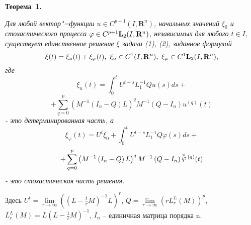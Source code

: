 \textbf{Теорема~1.} {\it
Для любой вектор"=функции $u \in C^{p+1} (I ,{\mathbf R}^{n} )$, начальных значений $\xi _{0}$ и стохастического процесса $\varphi \in C^{p+1} {\bf L}_{2} (I ,{\mathbf R}^{n} )$, независимых для любого $t\in I $, существует единственное решение $\xi $ задачи (1), (2), заданное формулой
 $$
  \xi (t)=\xi_{u}(t)+\xi_{\varphi} (t), \ \xi_u \in C^{1}(I ,{\mathbf R}^{n}),\ \xi_{\varphi} \in C^{1} {\bf L}_{2} (I ,{\mathbf R}^{n} ),
  $$
где
$$
\xi_{u}(t)=\!\int _{0}^{t}U ^{t-s} L_{1}^{-1} Qu (s)ds+
$$
$$
+\sum _{q=0}^{p}\left(M^{-1} \left(I_{n} -Q\right)L\right)^{q} M^{-1} \left(Q-I_{n} \right)u^{(q)} (t)
$$
- это детерминированная часть, а
$$
\xi_{\varphi} (t)=U ^{t} \xi _{0} +\int _{0}^{t}U ^{t-s} L_{1}^{-1} Q\varphi (s)ds+
$$
$$
+\sum _{q=0}^{p}\left(M^{-1} \left(I_{n} -Q\right)L\right)^{q} M^{-1} \left(Q-I_{n} \right) \mathop{\varphi }\limits^{{\rm o}}{}^{(q)} (t)
$$
- это стохастическая часть решения.
	
	Здесь $U ^{t} =\lim \limits_{r \to \infty } \left( \left( L-{\frac{t}{r}} M\right)^{-1} L \right)^{r} $,
	$Q=\lim \limits_{r \to \infty} \left( rL_{r}^{L} (M) \right)^{p} $,
	$L_{r}^{L} (M) \! = \!\! L \! \left(L-{\frac{1}{r}} M \right)^{-1} \!\!$,
	 $I_{n} \!$ -- единичная матрица порядка n.
}


